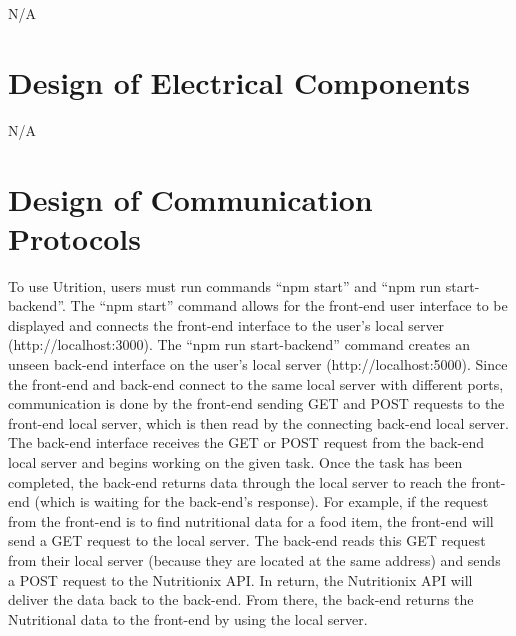 \documentclass[12pt, titlepage]{article}
\begin{document}

N/A

\section{Design of Electrical Components}


N/A

\section{Design of Communication Protocols}


To use Utrition, users must run commands “npm start” and “npm run start-backend”. The “npm start” command allows for the front-end user interface to be displayed and connects the front-end interface to the user’s local server (http://localhost:3000). The “npm run start-backend” command creates an unseen back-end interface on the user’s local server (http://localhost:5000). Since the front-end and back-end connect to the same local server with different ports, communication is done by the front-end sending GET and POST requests to the front-end local server, which is then read by the connecting back-end local server. The back-end interface receives the GET or POST request from the back-end local server and begins working on the given task. Once the task has been completed, the back-end returns data through the local server to reach the front-end (which is waiting for the back-end’s response). For example, if the request from the front-end is to find nutritional data for a food item, the front-end will send a GET request to the local server. The back-end reads this GET request from their local server (because they are located at the same address) and sends a POST request to the Nutritionix API. In return, the Nutritionix API will deliver the data back to the back-end. From there, the back-end returns the Nutritional data to the front-end by using the local server. 
\end{document}

